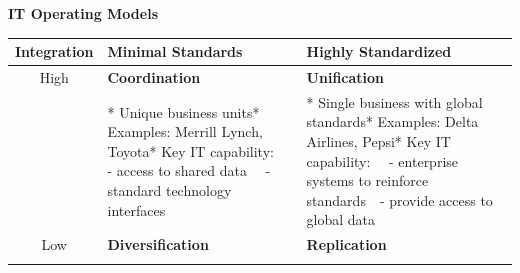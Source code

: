 \documentclass[]{book}
\begin{document}
\textbf{IT Operating Models}

\begin{longtable}[]{@{}cll@{}}
\toprule
\begin{minipage}[b]{0.14\columnwidth}\centering
Integration\strut
\end{minipage} & \begin{minipage}[b]{0.45\columnwidth}\raggedright
Minimal Standards\strut
\end{minipage} & \begin{minipage}[b]{0.32\columnwidth}\raggedright
Highly Standardized\strut
\end{minipage}\tabularnewline
\midrule
\endhead
\begin{minipage}[t]{0.14\columnwidth}\centering
High\strut
\end{minipage} & \begin{minipage}[t]{0.45\columnwidth}\raggedright
\textbf{Coordination}\strut
\end{minipage} & \begin{minipage}[t]{0.32\columnwidth}\raggedright
\textbf{Unification}\strut
\end{minipage}\tabularnewline
\begin{minipage}[t]{0.14\columnwidth}\centering
\strut
\end{minipage} & \begin{minipage}[t]{0.45\columnwidth}\raggedright
* Unique business units* Examples: Merrill Lynch, Toyota* Key IT capability:~~ - access to shared data~~ - standard technology interfaces\strut
\end{minipage} & \begin{minipage}[t]{0.32\columnwidth}\raggedright
* Single business with global standards* Examples: Delta Airlines, Pepsi* Key IT capability:~~ - enterprise systems to reinforce standards~~- provide access to global data\strut
\end{minipage}\tabularnewline
\begin{minipage}[t]{0.14\columnwidth}\centering
Low\strut
\end{minipage} & \begin{minipage}[t]{0.45\columnwidth}\raggedright
\textbf{Diversification}\strut
\end{minipage} & \begin{minipage}[t]{0.32\columnwidth}\raggedright
\textbf{Replication}\strut
\end{minipage}\tabularnewline
\begin{minipage}[t]{0.14\columnwidth}\centering
\strut

\end{minipage}
\end{longtable}
\end{document}
